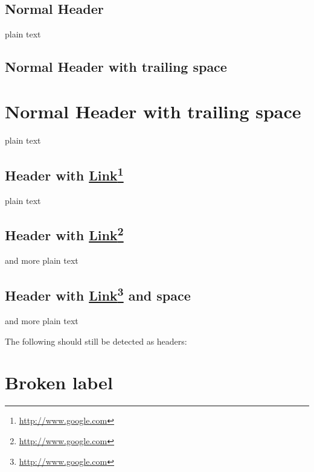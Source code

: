 
\def\mytitle{MultiMarkdown Headers Test}
\def\latexmode{memoir}

\section{Normal Header}
\label{normalheader}

plain text

\section{Normal Header with trailing space}
\label{normalheaderwithtrailingspace}

\chapter{Normal Header with trailing space}
\label{normalheaderwithtrailingspace}

plain text

\section{Header with \href{http://www.google.com}{Link}\footnote{\href{http://www.google.com}{http:\slash \slash www.google.com}}}
\label{headerwithlink}

plain text

\section{Header with \href{http://www.google.com}{Link}\footnote{\href{http://www.google.com}{http:\slash \slash www.google.com}}}
\label{headerwithlink}

and more plain text

\section{Header with \href{http://www.google.com}{Link}\footnote{\href{http://www.google.com}{http:\slash \slash www.google.com}} and space}
\label{headerwithlinkandspace}

and more plain text

The following should still be detected as headers:

\chapter{Broken label}
\label{}

